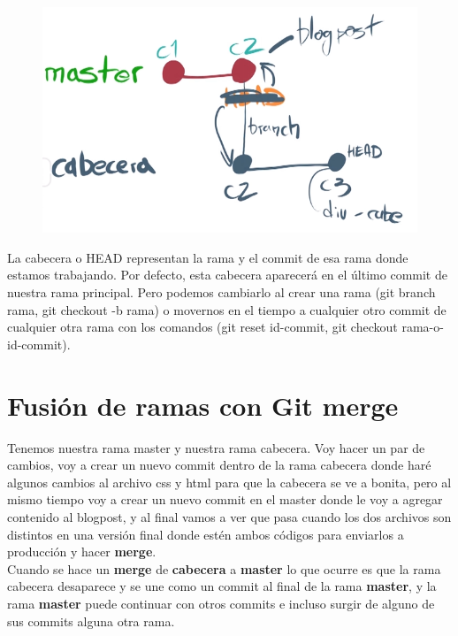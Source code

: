 \documentclass{article}
\begin{document}
\begin{figure}[h!]
  \centering
  \includegraphics[scale=0.75]{./Pictures/146_git_checkout.png}
\end{figure}


La cabecera o HEAD representan la rama y el commit de esa rama donde estamos
trabajando. Por defecto, esta cabecera aparecerá en el último commit de nuestra
rama principal. Pero podemos cambiarlo al crear una rama (git branch rama, git
checkout -b rama) o movernos en el tiempo a cualquier otro commit de cualquier
otra rama con los comandos (git reset id-commit, git checkout
rama-o-id-commit).\\


\newpage

\section{Fusión de ramas con Git merge}%
Tenemos nuestra rama master y nuestra rama cabecera. Voy hacer un par de
cambios, voy a crear un nuevo commit dentro de la rama cabecera donde haré
algunos cambios al archivo css y html para que la cabecera se ve a bonita, pero
al mismo tiempo voy a crear un nuevo commit en el master donde le voy a agregar
contenido al blogpost, y al final vamos a ver que pasa cuando los dos archivos
son distintos en una versión final donde estén ambos códigos para enviarlos a
producción y hacer \textbf{merge}.\\

Cuando se hace un \textbf{merge} de \textbf{cabecera} a \textbf{master} lo que
ocurre es que la rama cabecera desaparece y se une como un commit al final de
la rama \textbf{master}, y la rama \textbf{master} puede continuar con otros
commits e incluso surgir de alguno de sus commits alguna otra rama.
\end{document}

